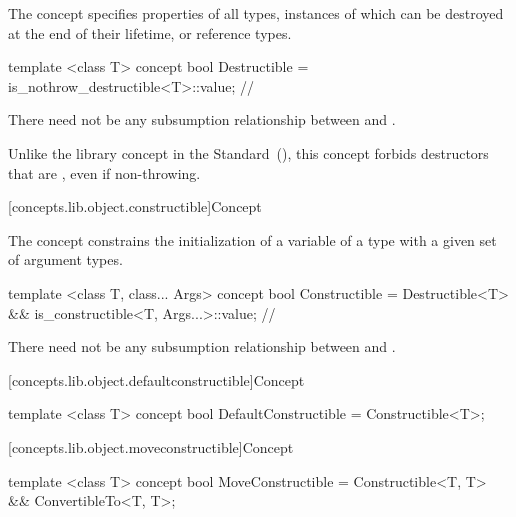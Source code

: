 \pnum
The  concept specifies properties of all types, instances of
which can be destroyed at the end of their lifetime, or reference types.

%
\begin{itemdecl}
template <class T>
concept bool Destructible = is_nothrow_destructible<T>::value; // \seebelow
\end{itemdecl}

\begin{itemdescr}
\pnum
There need not be any subsumption relationship between 
and .

\pnum
\enternote Unlike the  library concept in the \Cpp
Standard~(), this concept forbids destructors
that are , even if non-throwing. \exitnote
\end{itemdescr}

[concepts.lib.object.constructible]{Concept }

\pnum
The  concept constrains the initialization of a variable of
a type with a given set of argument types.

%
\begin{itemdecl}
template <class T, class... Args>
concept bool Constructible =
  Destructible<T> && is_constructible<T, Args...>::value; // \seebelow
\end{itemdecl}

\begin{itemdescr}
\pnum
There need not be any subsumption relationship between 
and .
\end{itemdescr}

[concepts.lib.object.defaultconstructible]{Concept }

%
\begin{itemdecl}
template <class T>
concept bool DefaultConstructible = Constructible<T>;
\end{itemdecl}

[concepts.lib.object.moveconstructible]{Concept }

%
\begin{itemdecl}
template <class T>
concept bool MoveConstructible =
  Constructible<T, T> && ConvertibleTo<T, T>;
\end{itemdecl}

